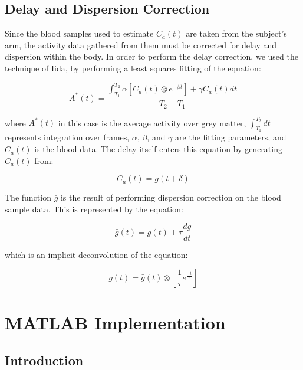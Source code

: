 \subsection{Delay and Dispersion Correction}
\label{sec:blood_correction}

Since the blood samples used to estimate $C_a(t)$ are taken from the
subject's arm, the activity data gathered from them must be corrected
for delay and dispersion within the body.  In order to perform the
delay correction, we used the technique of Iida, by performing a
least squares fitting of the equation:

\begin{equation}
A^{*}(t) = \frac{\int_{T_1}^{T_2} \alpha \left[ C_a(t) \otimes e^{-\beta
t} \right] + \gamma C_a(t) dt}{T_2 - T_1} \label{eq:delay_correc}
\end{equation}

where $A^{*}(t)$ in this case is the average activity over grey
matter, $\int_{T_1}^{T_2}dt$ represents integration over frames,
$\alpha$, $\beta$, and $\gamma$ are the fitting parameters, and
$C_a(t)$ is the blood data.  The delay itself enters this equation by
generating $C_a(t)$ from:

\begin{equation}
C_a(t) = \bar{g}(t+\delta)
\label{eq:blood_delay}
\end{equation}

The function $\bar{g}$ is the result of performing dispersion
correction on the blood sample data.  This is represented by the
equation:

\begin{equation}
\bar{g}(t) = g(t) + \tau \frac{dg}{dt}
\end{equation}

which is an implicit deconvolution of the equation:

\begin{equation}
g(t) = \bar{g}(t) \otimes \left[ \frac{1}{\tau} e^{\frac{-t}{\tau}}
\right]
\end{equation}


\newpage
\section{MATLAB Implementation}

\subsection{Introduction}

